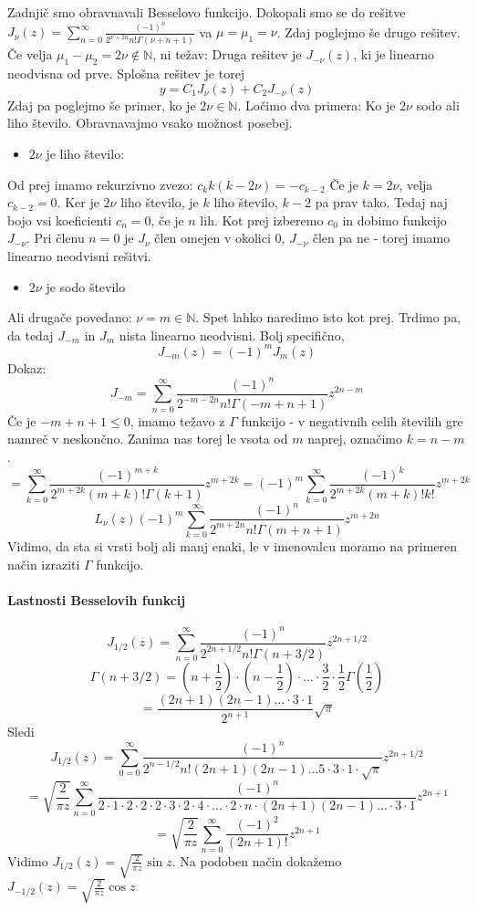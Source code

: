 \documentclass[a4paper]{article}
\newcommand{\N}{\mathbb{N}}
\newcommand{\Sum}[2][0]{\sum_{{#2} = {#1}}^{\infty}}
\begin{document}
Zadnjič smo obravnavali Besselovo funkcijo. Dokopali smo se do rešitve $\displaystyle{J_{\nu}(z) = \Sum{n} \frac{(-1)^n}{2^{\nu + 2n} n!\Gamma(\nu + n + 1)}}$ va $\mu = \mu_1 = \nu$.
Zdaj poglejmo še drugo rešitev. Če velja $\mu_1 - \mu_2 = 2\nu \notin \N$, ni težav:
Druga rešitev je $J_{-\nu}(z)$, ki je linearno neodvisna od prve.
Splošna rešitev je torej $$y = C_1J_{\nu}(z) + C_2J_{-\nu}(z)$$
Zdaj pa poglejmo še primer, ko je $2\nu \in \N$. Ločimo dva primera: Ko je $2\nu$ sodo ali liho število. Obravnavajmo vsako možnost posebej.
\begin{itemize}
    \item $2\nu$ je liho število:
\end{itemize}
Od prej imamo rekurzivno zvezo: $c_{k} k(k - 2\nu) = -c_{k-2}$
Če je $k = 2\nu$, velja $c_{k-2} = 0$. Ker je $2\nu$ liho število, je $k$ liho število, $k-2$ pa prav tako.
Tedaj naj bojo vsi koeficienti $c_n = 0$, če je $n$ lih. Kot prej izberemo $c_0$ in dobimo funkcijo $J_{-\nu}$. Pri členu $n=0$ je $J_\nu$ člen omejen v okolici $0$, $J_{-\nu}$ člen pa ne - torej imamo linearno neodvisni rešitvi.
\begin{itemize}
    \item $2\nu$ je sodo število
\end{itemize}
Ali drugače povedano: $\nu = m \in \N$. Spet lahko naredimo isto kot prej. Trdimo pa, da tedaj $J_{-m}$ in $J_{m}$ nista linearno neodvisni. Bolj specifično,
$$J_{-m}(z) = (-1)^mJ_m(z)$$
Dokaz: $$J_{-m} = \Sum{n} \frac{(-1)^n}{2^{-m-2n}n!\Gamma(-m+n+1)}z^{2n-m}$$
Če je $-m+n+1 \leq 0$, imamo težavo z $\Gamma$ funkcijo - v negativnih celih številih gre namreč v neskončno. Zanima nas torej le vsota od $m$ naprej, označimo $k = n-m$.
$$= \Sum{k}\frac{(-1)^{m+k}}{2^{m+2k}(m+k)!\Gamma(k+1)}z^{m+2k} = (-1)^m\Sum{k} \frac{(-1)^k}{2^{m+2k}(m+k)!k!}z^{m+2k}$$
$$L_\nu(z)(-1)^m\Sum{k}\frac{(-1)^n}{2^{m+2n}n!\Gamma(m + n + 1)}z^{m+2n}$$
Vidimo, da sta si vrsti bolj ali manj enaki, le v imenovalcu moramo na primeren način izraziti $\Gamma$ funkcijo.
\paragraph{Lastnosti Besselovih funkcij}
$$J_{1/2}(z) = \Sum{n} \frac{(-1)^n}{2^{2n + 1/2}n!\Gamma(n + 3/2)}z^{2n + 1/2}$$
$$\Gamma(n + 3/2) = (n+\frac{1}{2})\cdot(n-\frac{1}{2})\cdot...\cdot\frac{3}{2}\cdot\frac{1}{2}\Gamma\left(\frac{1}{2}\right)$$
$$= \frac{(2n+1)(2n-1)...\cdot 3 \cdot 1}{2^{n+1}}\sqrt{\pi}$$
Sledi $$J_{1/2}(z) = \Sum{0} \frac{(-1)^n}{2^{n-1/2}n!(2n+1)(2n-1)...5\cdot3\cdot1\cdot\sqrt{\pi}}z^{2n + 1/2}$$
$$= \sqrt{\frac{2}{\pi z}} \Sum{n} \frac{(-1)^n}{2\cdot 1 \cdot 2 \cdot 2 \cdot 2 \cdot 3 \cdot 2 \cdot 4 \cdot ... \cdot 2 \cdot n \cdot (2n+1)(2n-1)...\cdot 3\cdot 1}z^{2n+1}$$
$$= \sqrt{\frac{2}{\pi z}}\Sum{n} \frac{(-1)^2}{(2n+1)!}z^{2n+1}$$
Vidimo $\displaystyle{J_{1/2} (z) = \sqrt{\frac{2}{\pi z}}\sin z}$. Na podoben način dokažemo $\displaystyle{J_{-1/2} (z) = \sqrt{\frac{2}{\pi z}}\cos z}$
\end{document}
